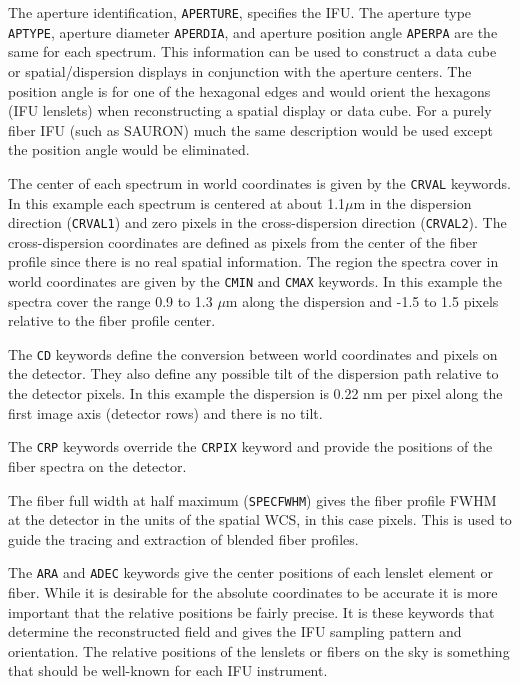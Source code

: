 \documentclass[twoside,11pt]{article}
\newcommand{\htmlref}[2]{#1}
\begin{document}
The aperture identification, {\tt APERTURE}, specifies the IFU. The aperture type {\tt APTYPE}, aperture diameter {\tt APERDIA}, and aperture position angle {\tt APERPA} are the same for each spectrum. This information can be used to \htmlref{construct a data cube}{sc16_mef2cub} or spatial/dispersion displays in conjunction with the aperture centers. The position angle is for one of the hexagonal edges and would orient the hexagons (IFU lenslets) when reconstructing a spatial display or data cube. For a purely fiber IFU (such as SAURON) much the same description would be used except the position angle would be eliminated. 

The center of each spectrum in world coordinates is given by the {\tt CRVAL} keywords. In this example each spectrum is centered at about 1.1$\mu$m in the dispersion direction ({\tt CRVAL1}) and zero pixels in the cross-dispersion direction ({\tt CRVAL2}). The cross-dispersion coordinates are defined as pixels from the center of the fiber profile since there is no real spatial information. 
The region the spectra cover in world coordinates are given by the {\tt CMIN} and {\tt CMAX} keywords. In this example the spectra cover the range 0.9 to 1.3 $\mu$m along the dispersion and -1.5 to 1.5 pixels relative to the fiber profile center. 

The {\tt CD} keywords define the conversion between world coordinates and pixels on the detector. They also define any possible tilt of the dispersion path relative to the detector pixels. In this example the dispersion is 0.22 nm per pixel along the first image axis (detector rows) and there is no tilt. 

The {\tt CRP} keywords override the {\tt CRPIX} keyword and provide the positions of the fiber spectra on the detector.

The fiber full width at half maximum ({\tt SPECFWHM}) gives the fiber profile FWHM at the detector in the units of the spatial WCS, in this case pixels. This is used to guide the tracing and extraction of blended fiber profiles. 

The {\tt ARA} and {\tt ADEC} keywords give the center positions of each lenslet element or fiber. While it is desirable for the absolute coordinates to be accurate it is more important that the relative positions be fairly precise. It is these keywords that determine the reconstructed field and gives the IFU sampling pattern and orientation. The relative positions of the lenslets or fibers on the sky is something that should be well-known for each IFU instrument. 
\end{document}
